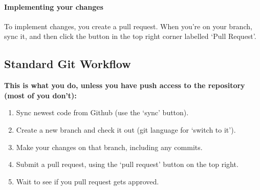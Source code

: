 \documentclass[12p,a4papert]{article}
\begin{document}
\paragraph{Implementing your changes}To implement changes, you create a pull request. When you're on your branch, sync it, and then click the button in the top right corner labelled `Pull Request'.

\subsection{Standard Git Workflow}
\textbf{This is what you do, unless you have push access to the repository (most of you don't):}
\begin{enumerate}
\item{Sync newest code from Github (use the `sync' button).}
\item{Create a new branch and check it out (git language for `switch to it').}
\item{Make your changes on that branch, including any commits.}
\item{Submit a pull request, using the `pull request' button on the top right.}
\item{Wait to see if you pull request gets approved.}
\end{enumerate}
\end{document}
